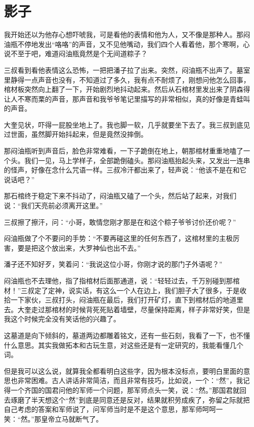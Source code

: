 \chapter{影子}

我开始还以为他存心想吓唬我，可是看他的表情和他为人，又不像是那种人。那闷油瓶不停地发出“咯咯”的声音，又不见他嘴动，我们四个人看着他，那个寒啊，心说不至于吧，难道闷油瓶竟然是个无间道粽子？

三叔看到看他表情这么恐怖，一把把潘子拉了出来。突然，闷油瓶不出声了。墓室里静得一点声音也没有，不知道过了多久，我有点不耐烦了，刚想问他怎么回事，棺材板突然向上翻了一下，开始剧烈地抖动起来。然后从石棺材里发出来了阴森得让人不寒而栗的声音，那声音和我爷爷笔记里描写的非常相似，真的好像是青蛙叫的声音。

大奎见状，吓得一屁股坐地上了。我也脚一软，几乎就要坐下去了。我三叔到底见过世面，虽然脚开始抖起来，但是竟然没摔倒。

那闷油瓶听到声音后，脸色非常难看，一下子跪倒在地上，朝那棺材重重地嗑了一个头。我们一见，马上学样子，全部跪倒磕头。那闷油瓶抬起头来，又发出一连串的怪声，好像在念什么咒语一样。三叔冷汗都出来了，轻声说：“他该不是在和它说话吧？”

那石棺终于稳定下来不抖动了，闷油瓶又磕了一个头，然后站了起来，对我们说：“我们天亮前必须离开这里。”

三叔擦了擦汗，问：“小哥，敢情您刚才那是在和这个粽子爷爷讨价还价呢？”

闷油瓶做了个不要问的手势：“不要再碰这里的任何东西了，这棺材里的主极厉害，要是把这个放出来，大罗神仙也出不去。”

潘子还不知好歹，笑着问：“我说这位小哥，你刚才说的那门子外语呢？”

闷油瓶也不去理他，指了指棺材后面那通道，说：“轻轻过去，千万别碰到那棺材！”三叔定了定神，说实话，有这么一个人在边上，我们胆子大了很多，于是收拾一下家伙，三叔打头，闷油瓶在最后，我们打开矿灯，直下到棺材后的地道里去。大奎走过那棺材的时候背死死贴着墙壁，尽量保持距离，样子非常好笑，但是我这个时候完全没有笑话他的兴趣了。

这墓道是向下倾斜的，墓道两边都雕着铭文，还有一些石刻，我看了一下，也不懂什么意思。其实我做拓本和古玩生意，对这些还是有一定研究的，我能看懂几个词。

但是我可以这么说，就算我全都看明白这些字，因为根本没标点，要明白里面的意思也非常困难。古人讲话非常简洁，而且非常有技巧，比如说，一个：“然”，我记得一个齐国的国君问他的军师一个问题，那军师点头一笑，说：“然。”那国君就回去琢磨了半天想这个“然”到底是同意还是反对，结果就积劳成疾了，弥留之际就把自己考虑的答案和军师说了，问军师当时是不是这个意思，那军师呵呵一笑：“然。”那皇帝立马就断气了。


